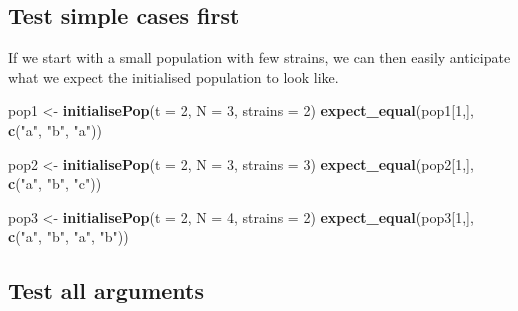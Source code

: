 \documentclass[10pt,letterpaper]{article}
\newenvironment{Shaded}{\begin{snugshade}}{\end{snugshade}}
\newcommand{\DataTypeTok}[1]{\textcolor[rgb]{0.13,0.29,0.53}{#1}}
\newcommand{\DecValTok}[1]{\textcolor[rgb]{0.00,0.00,0.81}{#1}}
\newcommand{\KeywordTok}[1]{\textcolor[rgb]{0.13,0.29,0.53}{\textbf{#1}}}
\newcommand{\NormalTok}[1]{#1}
\newcommand{\StringTok}[1]{\textcolor[rgb]{0.31,0.60,0.02}{#1}}
\begin{document}
\hypertarget{easycases}{%
\subsection*{Test simple cases first}\label{easycases}}

If we start with a small population with few strains, we can then easily anticipate what we expect the initialised population to look like.
\newline
{}\label{test_simple_first}

\begin{Shaded}
\begin{Highlighting}[]
\NormalTok{pop1 <-}\StringTok{ }\KeywordTok{initialisePop}\NormalTok{(}\DataTypeTok{t =} \DecValTok{2}\NormalTok{, }\DataTypeTok{N =} \DecValTok{3}\NormalTok{, }\DataTypeTok{strains =} \DecValTok{2}\NormalTok{) }
\KeywordTok{expect_equal}\NormalTok{(pop1[}\DecValTok{1}\NormalTok{,], }\KeywordTok{c}\NormalTok{(}\StringTok{"a"}\NormalTok{, }\StringTok{"b"}\NormalTok{, }\StringTok{"a"}\NormalTok{))}

\NormalTok{pop2 <-}\StringTok{ }\KeywordTok{initialisePop}\NormalTok{(}\DataTypeTok{t =} \DecValTok{2}\NormalTok{, }\DataTypeTok{N =} \DecValTok{3}\NormalTok{, }\DataTypeTok{strains =} \DecValTok{3}\NormalTok{) }
\KeywordTok{expect_equal}\NormalTok{(pop2[}\DecValTok{1}\NormalTok{,], }\KeywordTok{c}\NormalTok{(}\StringTok{"a"}\NormalTok{, }\StringTok{"b"}\NormalTok{, }\StringTok{"c"}\NormalTok{))}

\NormalTok{pop3 <-}\StringTok{ }\KeywordTok{initialisePop}\NormalTok{(}\DataTypeTok{t =} \DecValTok{2}\NormalTok{, }\DataTypeTok{N =} \DecValTok{4}\NormalTok{, }\DataTypeTok{strains =} \DecValTok{2}\NormalTok{) }
\KeywordTok{expect_equal}\NormalTok{(pop3[}\DecValTok{1}\NormalTok{,], }\KeywordTok{c}\NormalTok{(}\StringTok{"a"}\NormalTok{, }\StringTok{"b"}\NormalTok{, }\StringTok{"a"}\NormalTok{, }\StringTok{"b"}\NormalTok{))}
\end{Highlighting}
\end{Shaded}

\hypertarget{testargs}{%
\subsection*{Test all arguments}\label{testargs}}
\end{document}
